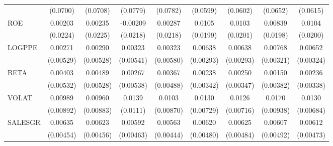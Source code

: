 \begin{table}[htbp]
\begin{tabular}{l*{8}{c}}
                    &    (0.0700)         &    (0.0708)         &    (0.0779)         &    (0.0782)         &    (0.0599)         &    (0.0602)         &    (0.0652)         &    (0.0615)         \\
ROE                 &     0.00203         &     0.00235         &    -0.00209         &     0.00287         &      0.0105         &      0.0103         &     0.00839         &      0.0104         \\
                    &    (0.0224)         &    (0.0225)         &    (0.0218)         &    (0.0218)         &    (0.0199)         &    (0.0201)         &    (0.0198)         &    (0.0200)         \\
LOGPPE              &     0.00271         &     0.00290         &     0.00323         &     0.00323         &     0.00638\sym{**} &     0.00638\sym{*}  &     0.00768\sym{**} &     0.00652\sym{*}  \\
                    &   (0.00529)         &   (0.00528)         &   (0.00541)         &   (0.00580)         &   (0.00293)         &   (0.00293)         &   (0.00321)         &   (0.00324)         \\
BETA                &     0.00403         &     0.00489         &     0.00267         &     0.00367         &     0.00238         &     0.00250         &     0.00150         &     0.00236         \\
                    &   (0.00532)         &   (0.00528)         &   (0.00538)         &   (0.00488)         &   (0.00342)         &   (0.00347)         &   (0.00382)         &   (0.00338)         \\
VOLAT               &     0.00989         &     0.00960         &      0.0139         &      0.0103         &      0.0130\sym{*}  &      0.0126         &      0.0170\sym{*}  &      0.0130\sym{*}  \\
                    &   (0.00892)         &   (0.00883)         &    (0.0111)         &   (0.00870)         &   (0.00729)         &   (0.00716)         &   (0.00938)         &   (0.00684)         \\
SALESGR             &     0.00635         &     0.00623         &     0.00592         &     0.00563         &     0.00620         &     0.00625         &     0.00607         &     0.00612         \\
                    &   (0.00454)         &   (0.00456)         &   (0.00463)         &   (0.00444)         &   (0.00480)         &   (0.00484)         &   (0.00492)         &   (0.00473)         \\

\end{tabular}
\end{table}
